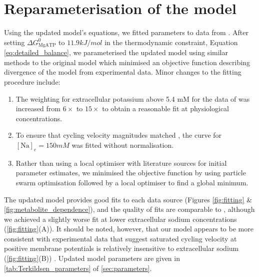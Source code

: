 \documentclass[fleqn,10pt]{physiome}
\begin{document}
\section{Reparameterisation of the model}
\label{sec:raparameterisation}
Using the updated model's equations, we fitted parameters to data from  \citet{terkildsen_balance_2007,terkildsen_modelling_2006}. After setting $\Delta G_\mathrm{MgATP}^0$ to $11.9\si{kJ/mol}$ in the thermodynamic constraint, Equation \eqref{eq:detailed_balance}, we parameterised the updated model using similar methods to the original model \citep{terkildsen_modelling_2006} which minimised an objective function describing divergence of the model from experimental data. Minor changes to the fitting procedure include:
\begin{enumerate}
	\item The weighting for extracellular potassium above 5.4 mM for the data of \citet{nakao_[na]_1989} was increased from $6\times$ to $15\times$ to obtain a reasonable fit at physiological concentrations.
	\item To ensure that cycling velocity magnitudes matched \citet{nakao_[na]_1989}, the curve for $[\mathrm{Na}]_e=150 \si{mM}$ was fitted without normalisation.
	\item Rather than using a local optimiser with literature sources for initial parameter estimates, we minimised the objective function by using particle swarm optimisation \citep{kennedy_particle_1995} followed by a local optimiser to find a global minimum.
\end{enumerate}
The updated model provides good fits to each data source (Figures \ref{fig:fitting} \& \ref{fig:metabolite_dependence}), and the quality of fits are comparable to \citet{terkildsen_modelling_2006}, although we achieved a slightly worse fit at lower extracellular sodium concentrations (\autoref{fig:fitting}(A)). It should be noted, however, that our model appears to be more consistent with experimental data that suggest saturated cycling velocity at positive membrane potentials is relatively insensitive to extracellular sodium (\autoref{fig:fitting}(B)) \citep{nakao_[na]_1989}. Updated model parameters are given in \autoref{tab:Terkildsen_parameters} of \autoref{sec:parameters}.
\end{document}
